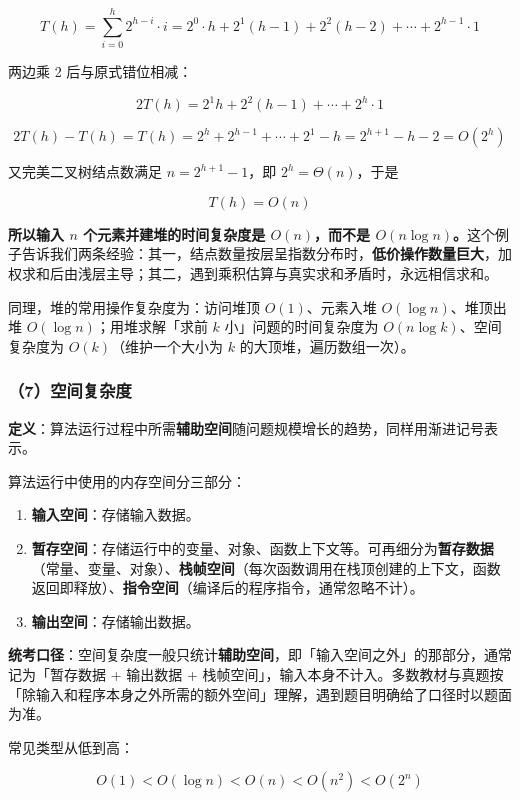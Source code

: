 \documentclass[11pt,openany,UTF8]{ctexbook}
\begin{document}
\[T(h)=\sum_{i=0}^{h} 2^{h-i}\cdot i = 2^{0}\cdot h + 2^{1}(h-1)+2^{2}(h-2)+\cdots+2^{h-1}\cdot 1\]

两边乘 2 后与原式错位相减：

\[2T(h)=2^{1}h+2^{2}(h-1)+\cdots+2^{h}\cdot 1\]

\[2T(h)-T(h)=T(h)=2^{h}+2^{h-1}+\cdots+2^{1}-h=2^{h+1}-h-2=O(2^{h})\]

又完美二叉树结点数满足 $n=2^{h+1}-1$，即 $2^{h}=\Theta(n)$，于是

\[T(h)=O(n)\]

\textbf{所以输入 $n$ 个元素并建堆的时间复杂度是 $O(n)$，而不是 $O(n\log n)$。}这个例子告诉我们两条经验：其一，结点数量按层呈指数分布时，\textbf{低价操作数量巨大}，加权求和后由浅层主导；其二，遇到乘积估算与真实求和矛盾时，永远相信求和。

同理，堆的常用操作复杂度为：访问堆顶 $O(1)$、元素入堆 $O(\log n)$、堆顶出堆 $O(\log n)$；用堆求解「求前 $k$ 小」问题的时间复杂度为 $O(n\log k)$、空间复杂度为 $O(k)$（维护一个大小为 $k$ 的大顶堆，遍历数组一次）。

\subsubsection{（7）空间复杂度}

\textbf{定义}：算法运行过程中所需\textbf{辅助空间}随问题规模增长的趋势，同样用渐进记号表示。

算法运行中使用的内存空间分三部分：

\begin{enumerate}
\item \textbf{输入空间}：存储输入数据。
\item \textbf{暂存空间}：存储运行中的变量、对象、函数上下文等。可再细分为\textbf{暂存数据}（常量、变量、对象）、\textbf{栈帧空间}（每次函数调用在栈顶创建的上下文，函数返回即释放）、\textbf{指令空间}（编译后的程序指令，通常忽略不计）。
\item \textbf{输出空间}：存储输出数据。
\end{enumerate}
\textbf{统考口径}：空间复杂度一般只统计\textbf{辅助空间}，即「输入空间之外」的那部分，通常记为「暂存数据 + 输出数据 + 栈帧空间」，输入本身不计入。多数教材与真题按「除输入和程序本身之外所需的额外空间」理解，遇到题目明确给了口径时以题面为准。

常见类型从低到高：

\[O(1) < O(\log n) < O(n) < O(n^2) < O(2^n)\]
\end{document}
